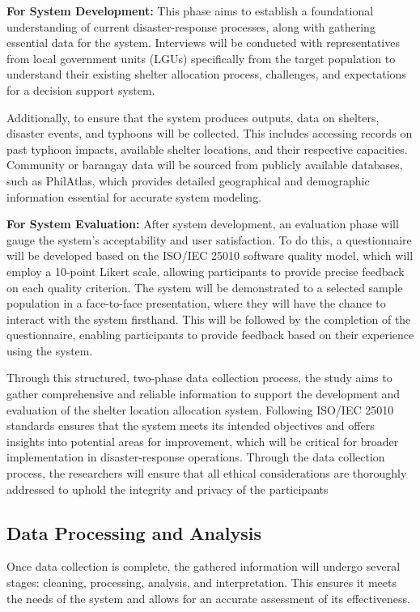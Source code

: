 \textbf{For System Development:} This phase aims to establish a foundational understanding of current disaster-response processes, along with gathering essential data for the system. Interviews will be conducted with representatives from local government units (LGUs) specifically from the target population to understand their existing shelter allocation process, challenges, and expectations for a decision support system. 

Additionally, to ensure that the system produces outputs, data on shelters, disaster events, and typhoons will be collected. This includes accessing records on past typhoon impacts, available shelter locations, and their respective capacities. Community or barangay data will be sourced from publicly available databases, such as PhilAtlas, which provides detailed geographical and demographic information essential for accurate system modeling.

\textbf{For System Evaluation:} After system development, an evaluation phase will gauge the system’s acceptability and user satisfaction. To do this, a questionnaire will be developed based on the ISO/IEC 25010 software quality model, which will employ a 10-point Likert scale, allowing participants to provide precise feedback on each quality criterion. The system will be demonstrated to a selected sample population in a face-to-face presentation, where they will have the chance to interact with the system firsthand. This will be followed by the completion of the questionnaire, enabling participants to provide feedback based on their experience using the system.

Through this structured, two-phase data collection process, the study aims to gather comprehensive and reliable information to support the development and evaluation of the shelter location allocation system. Following ISO/IEC 25010 standards ensures that the system meets its intended objectives and offers insights into potential areas for improvement, which will be critical for broader implementation in disaster-response operations. Through the data collection process, the researchers will ensure that all ethical considerations are thoroughly addressed to uphold the integrity and privacy of the participants

\subsection{Data Processing and Analysis}
Once data collection is complete, the gathered information will undergo several stages: cleaning, processing, analysis, and interpretation. This ensures it meets the needs of the system and allows for an accurate assessment of its effectiveness.

